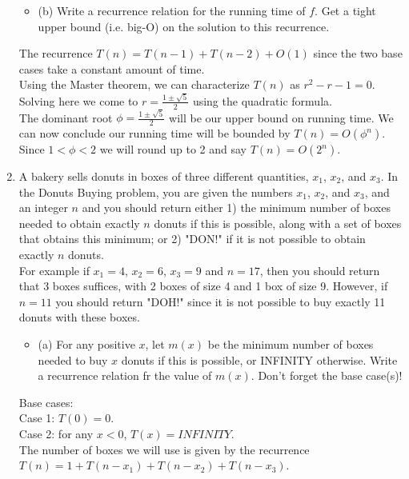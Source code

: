 \documentclass{article}
\begin{document}
\begin{enumerate}
\newpage 
\begin{itemize}
    \item (b) Write a recurrence relation for the running time of $f$. Get a tight upper bound (i.e. big-O) on the solution to this recurrence. 
\end{itemize}
The recurrence $T(n) = T(n-1) + T(n-2) + O(1)$ since the two base cases take a constant amount of time. \\
\newline 
Using the Master theorem, we can characterize $T(n)$ as $r^2 - r - 1 = 0$. Solving here we come to $r = \frac{1 \pm \sqrt{5}}{2}$ using the quadratic formula. \\
\newline 
The dominant root $\phi = \frac{1 \pm \sqrt{5}}{2}$ will be our upper bound on running time. We can now conclude our running time will be bounded by $T(n) = O(\phi^{n})$. Since $1 < \phi < 2$ we will round up to 2 and say $T(n) = O(2^{n})$.









\newpage
\item A bakery sells donuts in boxes of three different quantities, $x_1$, $x_2$, and $x_3$. In the Donuts Buying problem, you are given the numbers $x_1$, $x_2$, and $x_3$, and an integer $n$ and you should return either 1) the minimum number of boxes needed to obtain exactly $n$ donuts if this is possible, along with a set of boxes that obtains this minimum; or 2) "DON!" if it is not possible to obtain exactly $n$ donuts. \\
For example if $x_1 = 4$, $x_2 = 6$, $x_3 = 9$ and $n=17$, then you should return that 3 boxes suffices, with 2 boxes of size 4 and 1 box of size 9. However, if $n=11$ you should return "DOH!" since it is not possible to buy exactly 11 donuts with these boxes. 
\begin{itemize}
    \item (a) For any positive $x$, let $m(x)$ be the minimum number of boxes needed to buy $x$ donuts if this is possible, or INFINITY otherwise. Write a recurrence relation fr the value of $m(x)$. Don't forget the base case(s)!
\end{itemize}
Base cases: \\
Case 1: $T(0) = 0$. \\
Case 2: for any $x<0$, $T(x) = INFINITY$. \\
\newline 
The number of boxes we will use is given by the recurrence $T(n) = 1 + T(n-x_1) + T(n-x_2) + T(n-x_3)$. \\
\newline 







\end{enumerate}
\end{document}
